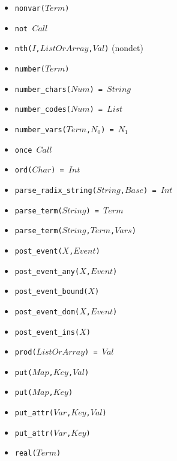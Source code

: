 \documentclass[10pt]{article}
\begin{document}
\begin{multicols}{2}
\begin{scriptsize}
\begin{itemize}
    \item \texttt{nonvar($Term$)} 
    \item \texttt{not $Call$}
    \item \texttt{nth($I$,$ListOrArray$,$Val$)} (nondet)
    \item \texttt{number($Term$)} 
    \item \texttt{number\_chars($Num$) = $String$} 
    \item \texttt{number\_codes($Num$) = $List$} 
    \item \texttt{number\_vars($Term$,$N_0$) = $N_1$}
    \item \texttt{once $Call$}
    \item \texttt{ord($Char$) = $Int$} 
    \item \texttt{parse\_radix\_string($String$,$Base$) = $Int$}
    \item \texttt{parse\_term($String$) = $Term$}
    \item \texttt{parse\_term($String$,$Term$,$Vars$)}
    \item \texttt{post\_event($X$,$Event$)}
    \item \texttt{post\_event\_any($X$,$Event$)}
    \item \texttt{post\_event\_bound($X$)}
    \item \texttt{post\_event\_dom($X$,$Event$)}
    \item \texttt{post\_event\_ins($X$)}
    \item \texttt{prod($ListOrArray$) = $Val$}
    \item \texttt{put($Map$,$Key$,$Val$)} 
    \item \texttt{put($Map$,$Key$)} 
    \item \texttt{put\_attr($Var$,$Key$,$Val$)} 
    \item \texttt{put\_attr($Var$,$Key$)} 
    \item \texttt{real($Term$)} 

\end{itemize}
\end{scriptsize}
\end{multicols}
\end{document}
